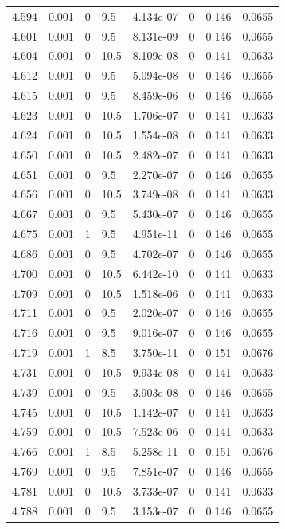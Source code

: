 \documentclass[preview]{standalone}
\begin{document}
{{{{{{{{{{{{{{\begin{tabular}{L{1.2cm}C{1.2cm} C{0.3cm}C{0.5cm} C{1.4cm}C{1.4cm} C{1.4cm}C{1.4cm}}
  4.594  &  0.001  & 0     & 9.5 &  4.134e-07  & 0  & 0.146 &  0.0655   \\ 
  4.601  &  0.001  & 0     & 9.5 &  8.131e-09  & 0  & 0.146 &  0.0655   \\ 
  4.604  &  0.001  & 0     & 10.5 &  8.109e-08  & 0  & 0.141 &  0.0633   \\ 
  4.612  &  0.001  & 0     & 9.5 &  5.094e-08  & 0  & 0.146 &  0.0655   \\ 
  4.615  &  0.001  & 0     & 9.5 &  8.459e-06  & 0  & 0.146 &  0.0655   \\ 
  4.623  &  0.001  & 0     & 10.5 &  1.706e-07  & 0  & 0.141 &  0.0633   \\ 
  4.624  &  0.001  & 0     & 10.5 &  1.554e-08  & 0  & 0.141 &  0.0633   \\ 
  4.650  &  0.001  & 0     & 10.5 &  2.482e-07  & 0  & 0.141 &  0.0633   \\ 
  4.651  &  0.001  & 0     & 9.5 &  2.270e-07  & 0  & 0.146 &  0.0655   \\ 
  4.656  &  0.001  & 0     & 10.5 &  3.749e-08  & 0  & 0.141 &  0.0633   \\ 
  4.667  &  0.001  & 0     & 9.5 &  5.430e-07  & 0  & 0.146 &  0.0655   \\ 
  4.675  &  0.001  & 1     & 9.5 &  4.951e-11  & 0  & 0.146 &  0.0655   \\ 
  4.686  &  0.001  & 0     & 9.5 &  4.702e-07  & 0  & 0.146 &  0.0655   \\ 
  4.700  &  0.001  & 0     & 10.5 &  6.442e-10  & 0  & 0.141 &  0.0633   \\ 
  4.709  &  0.001  & 0     & 10.5 &  1.518e-06  & 0  & 0.141 &  0.0633   \\ 
  4.711  &  0.001  & 0     & 9.5 &  2.020e-07  & 0  & 0.146 &  0.0655   \\ 
  4.716  &  0.001  & 0     & 9.5 &  9.016e-07  & 0  & 0.146 &  0.0655   \\ 
  4.719  &  0.001  & 1     & 8.5 &  3.750e-11  & 0  & 0.151 &  0.0676   \\ 
  4.731  &  0.001  & 0     & 10.5 &  9.934e-08  & 0  & 0.141 &  0.0633   \\ 
  4.739  &  0.001  & 0     & 9.5 &  3.903e-08  & 0  & 0.146 &  0.0655   \\ 
  4.745  &  0.001  & 0     & 10.5 &  1.142e-07  & 0  & 0.141 &  0.0633   \\ 
  4.759  &  0.001  & 0     & 10.5 &  7.523e-06  & 0  & 0.141 &  0.0633   \\ 
  4.766  &  0.001  & 1     & 8.5 &  5.258e-11  & 0  & 0.151 &  0.0676   \\ 
  4.769  &  0.001  & 0     & 9.5 &  7.851e-07  & 0  & 0.146 &  0.0655   \\ 
  4.781  &  0.001  & 0     & 10.5 &  3.733e-07  & 0  & 0.141 &  0.0633   \\ 
  4.788  &  0.001  & 0     & 9.5 &  3.153e-07  & 0  & 0.146 &  0.0655   \\ 
\hline 
\end{tabular} 

}}}}}}}}}}}}}}
\end{document}
